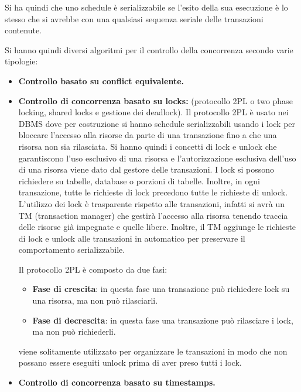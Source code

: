 Si ha quindi che uno schedule è serializzabile se l'esito della sua esecuzione è
lo stesso che si avrebbe con una qualsiasi sequenza seriale delle transazioni
contenute.

Si hanno quindi diversi algoritmi per il controllo della concorrenza secondo
varie tipologie:
\begin{itemize}
      \item \textbf{Controllo basato su conflict equivalente.}
      \item \textbf{Controllo di concorrenza basato su locks:} (protocollo 2PL o two
            phase locking, shared locks e gestione dei deadlock). Il protocollo
            2PL è usato nei DBMS dove per costruzione si hanno schedule
            serializzabili usando i lock per bloccare l'accesso alla risorse da
            parte di una transazione fino a che una risorsa non sia rilasciata.
            Si hanno quindi i concetti di lock e unlock che garantiscono l'uso
            esclusivo di una risorsa e l'autorizzazione esclusiva dell'uso di una
            risorsa viene dato dal gestore delle transazioni. I lock si possono
            richiedere su tabelle, database o porzioni di tabelle.
            Inoltre, in ogni transazione, tutte le richieste di lock precedono tutte
            le richieste di unlock. L'utilizzo dei lock è trasparente rispetto alle
            transazioni, infatti si avrà un TM (transaction manager) che gestirà
            l'accesso alla risorsa tenendo traccia delle risorse già impegnate e quelle
            libere. Inoltre, il TM aggiunge le richieste di lock e unlock alle
            transazioni in automatico per preservare il comportamento serializzabile.

            Il protocollo 2PL è composto da due fasi:
            \begin{itemize}
                  \item \textbf{Fase di crescita}: in questa fase una transazione può
                        richiedere lock su una risorsa, ma non può rilasciarli.
                  \item \textbf{Fase di decrescita}: in questa fase una transazione può
                        rilasciare i lock, ma non può richiederli.
            \end{itemize}
            viene solitamente utilizzato per organizzare le transazioni in modo
            che non possano essere eseguiti unlock prima di aver preso tutti i lock.
      \item \textbf{Controllo di concorrenza basato su timestamps.}
\end{itemize}